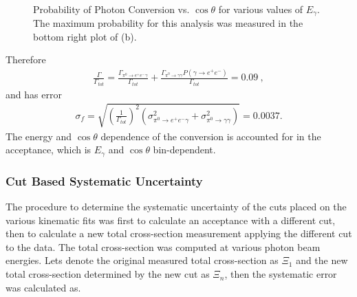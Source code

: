 \begin{figure}[h!]\begin{center}
\\
\caption[Probability of Photon Conversion vs. $\cos\theta$ for various values of $E_\gamma$]{\label{fig:convprob_all}Probability of Photon Conversion vs. $\cos\theta$ for various values of $E_\gamma$. The maximum probability for this analysis was measured in the bottom right plot of (b).}
\end{center}\end{figure}
Therefore
\begin{align}
 \frac{\Gamma}{\Gamma_{tot}} = \frac{\Gamma_{\pi^{0}\rightarrow e^{+}e^{-}\gamma}}{\Gamma_{tot}} + \frac{\Gamma_{\pi^{0}\rightarrow \gamma \gamma}P(\gamma \to  e^{+}e^{-})}{\Gamma_{tot}} = 0.09 \ ,
\end{align}
and has error
\begin{align}
\sigma_f = \sqrt{\left(\frac{1}{\Gamma_{tot}}\right)^2(\sigma^2_{\pi^{0}\rightarrow e^{+}e^{-}\gamma} + \sigma^2_{\pi^{0}\rightarrow \gamma \gamma})  } = 0.0037.  
\end{align}
The energy and $\cos \theta$ dependence of the conversion is accounted for in the acceptance, which is $E_\gamma$ and $\cos \theta$ bin-dependent. 


\FloatBarrier

\subsubsection{Cut Based Systematic Uncertainty}
The procedure to determine the systematic uncertainty of the cuts placed on the various kinematic fits was first to calculate an acceptance with a different cut, then to calculate a new total cross-section measurement applying the different cut to the data. The total cross-section was computed at various photon beam energies. Lets denote the original measured total cross-section as $\Xi_1$ and the new total cross-section determined by the new cut as $\Xi_n$, then the systematic error was calculated as.


